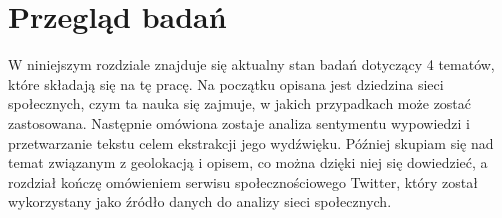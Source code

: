 \chapter{Przegląd badań}
\label{chapter:przegladbadan}

W niniejszym rozdziale znajduje się aktualny stan badań dotyczący 4 tematów,
które składają się na tę pracę. Na początku opisana jest dziedzina sieci
społecznych, czym ta nauka się zajmuje, w jakich przypadkach może zostać
zastosowana.
Następnie omówiona zostaje analiza sentymentu wypowiedzi i przetwarzanie tekstu
celem ekstrakcji jego wydźwięku.
Później skupiam się nad temat związanym z geolokacją i opisem, co można dzięki
niej się dowiedzieć, a rozdział kończę omówieniem serwisu społecznościowego Twitter,
który został wykorzystany jako źródło danych do analizy sieci społecznych.








